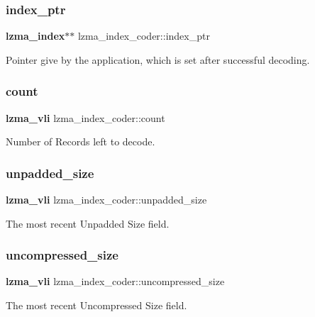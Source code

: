 \subsubsection{index\+\_\+ptr}
{\footnotesize\ttfamily \textbf{ lzma\+\_\+index}$\ast$$\ast$ lzma\+\_\+index\+\_\+coder\+::index\+\_\+ptr}

Pointer give by the application, which is set after successful decoding. \mbox{\label{structlzma__index__coder_a0ed7f3e1e7058f9794f37db539a33162}} 
\subsubsection{count}
{\footnotesize\ttfamily \textbf{ lzma\+\_\+vli} lzma\+\_\+index\+\_\+coder\+::count}



Number of Records left to decode. 

\mbox{\label{structlzma__index__coder_a04c6772cbdecd173db1e6c13a38d297a}} 
\subsubsection{unpadded\+\_\+size}
{\footnotesize\ttfamily \textbf{ lzma\+\_\+vli} lzma\+\_\+index\+\_\+coder\+::unpadded\+\_\+size}



The most recent Unpadded Size field. 

\mbox{\label{structlzma__index__coder_a18dd77a2be26af1b36d9b8bcd394d30e}} 
\subsubsection{uncompressed\+\_\+size}
{\footnotesize\ttfamily \textbf{ lzma\+\_\+vli} lzma\+\_\+index\+\_\+coder\+::uncompressed\+\_\+size}



The most recent Uncompressed Size field. 

\mbox{\label{structlzma__index__coder_ad95d36e40ff3ccf5ea0c92ad49aa7c66}} 
